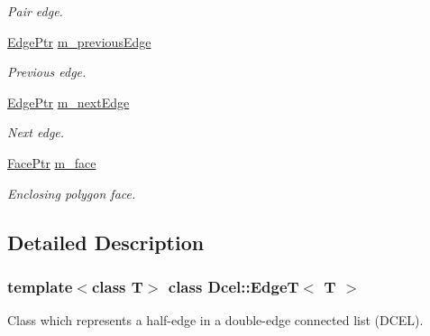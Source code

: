 \begin{DoxyCompactItemize}
\begin{DoxyCompactList}\small\item\em Pair edge. \end{DoxyCompactList}\item 
\mbox{\label{classDcel_1_1EdgeT_a77d21fbad704f8aa84aeddeaff1532fd}} 
\hyperlink{classDcel_1_1EdgeT_af525f4228d820f6b8b23fc02d937e4c8}{Edge\+Ptr} \hyperlink{classDcel_1_1EdgeT_a77d21fbad704f8aa84aeddeaff1532fd}{m\+\_\+previous\+Edge}
\begin{DoxyCompactList}\small\item\em Previous edge. \end{DoxyCompactList}\item 
\mbox{\label{classDcel_1_1EdgeT_a26de8e8184c0a6656a2cee2af1bc0230}} 
\hyperlink{classDcel_1_1EdgeT_af525f4228d820f6b8b23fc02d937e4c8}{Edge\+Ptr} \hyperlink{classDcel_1_1EdgeT_a26de8e8184c0a6656a2cee2af1bc0230}{m\+\_\+next\+Edge}
\begin{DoxyCompactList}\small\item\em Next edge. \end{DoxyCompactList}\item 
\mbox{\label{classDcel_1_1EdgeT_a47aaa6dbeeb6a56f1c7b6d73b2119761}} 
\hyperlink{classDcel_1_1EdgeT_a97dd9849ea4a21223095f852e48e36e8}{Face\+Ptr} \hyperlink{classDcel_1_1EdgeT_a47aaa6dbeeb6a56f1c7b6d73b2119761}{m\+\_\+face}
\begin{DoxyCompactList}\small\item\em Enclosing polygon face. \end{DoxyCompactList}\end{DoxyCompactItemize}


\subsection{Detailed Description}
\subsubsection*{template$<$class T$>$\newline
class Dcel\+::\+Edge\+T$<$ T $>$}

Class which represents a half-\/edge in a double-\/edge connected list (D\+C\+EL). 

